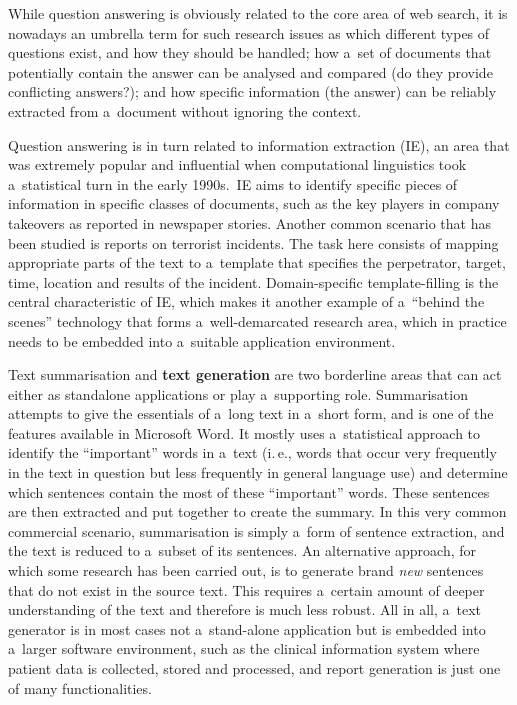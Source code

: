 \begin{multicols}{2}
While question answering is obviously related to the core area of web
search, it is nowadays an umbrella term for such research issues as
which different types of questions exist, and how they should be
handled; how a~set of documents that potentially contain the answer
can be analysed and compared (do they provide conflicting answers?);
and how specific information (the answer) can be reliably extracted
from a~document without ignoring the context. 

Question answering is in turn related to information extraction (IE),
an area that was extremely popular and influential when computational
linguistics took a~statistical turn in the early 1990s.~IE aims to
identify specific pieces of information in specific classes of
documents, such as the key players in company takeovers as reported in
newspaper stories. Another common scenario that has been studied is
reports on terrorist incidents. The task here consists of mapping
appropriate parts of the text to a~template that specifies the
perpetrator, target, time, location and results of the incident.
Domain-specific template-filling is the central characteristic of IE,
which makes it another example of a~“behind the scenes” technology
that forms a~well-demarcated research area, which in practice needs to
be embedded into a~suitable application environment. 


Text summarisation and \textbf{text generation} are two borderline
areas that can act either as standalone applications or play
a~supporting role. Summarisation attempts to give the essentials of
a~long text in a~short form, and is one of the features available in
Microsoft Word. It mostly uses a~statistical approach to identify the
“important” words in a~text (i.\,e., words that occur very
frequently in the text in question but less frequently in general
language use) and determine which sentences contain the most of these
“important” words. These sentences are then extracted and put
together to create the summary. In this very common commercial
scenario, summarisation is simply a~form of sentence extraction, and
the text is reduced to a~subset of its sentences. An alternative
approach, for which some research has been carried out, is to generate
brand \emph{new} sentences that do not exist in the source text. This
requires a~certain amount of deeper understanding of the text and
therefore is much less robust. All in all, a~text generator is in most
cases not a~stand-alone application but is embedded into a~larger
software environment, such as the clinical information system where
patient data is collected, stored and processed, and report generation
is just one of many functionalities. 


\end{multicols}
